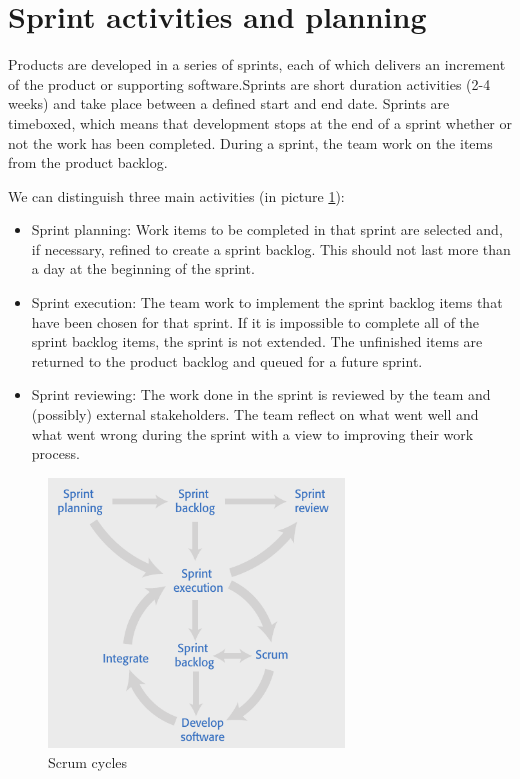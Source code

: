 \documentclass[10pt,a4paper]{report}
\begin{document}
\section{Sprint activities and planning}
 Products are developed in a series of sprints, each of which delivers an increment of the product or supporting software.Sprints are short duration activities (2-4 weeks) and take place between
a defined start and end date. Sprints are timeboxed, which means that development stops at the end of a sprint whether or not the work has been completed. During a sprint, the team work on the items from the product backlog.

We can distinguish three main activities (in picture \ref{image11}):
\begin{itemize}
	\item Sprint planning: Work items to be completed in that sprint are selected and, if necessary,
	refined to create a sprint backlog. This should not last more than a day at
	the beginning of the sprint.
	\item Sprint execution:	The team work to implement the sprint backlog items that have been
	chosen for that sprint. If it is impossible to complete all of the sprint
	backlog items, the sprint is not extended. The unfinished items are
	returned to the product backlog and queued for a future sprint.
	\item Sprint reviewing: The work done in the sprint is reviewed by the team and (possibly)
	external stakeholders. The team reflect on what went well and what went
	wrong during the sprint with a view to improving their work process.
\end{itemize}
\begin{figure}[h]
	\centering
	\includegraphics[width=0.7\textwidth]{image11}
	\caption{Scrum cycles}
	\label{image11}
\end{figure}
\end{document}
